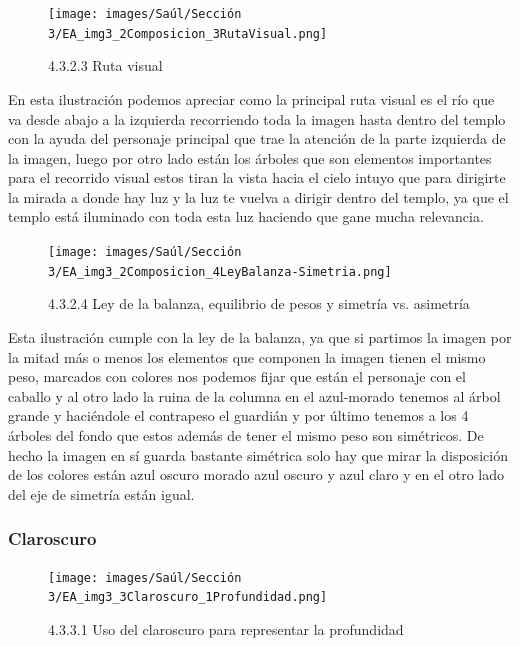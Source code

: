 \documentclass[12pt]{article}
\begin{document}
    \begin{figure}[H]
      \centering
      \texttt{[image: images/Saúl/Sección 3/EA\_img3\_2Composicion\_3RutaVisual.png]}
      \caption{\small 4.3.2.3 Ruta visual}
    \end{figure}

 En esta ilustración podemos apreciar como la principal ruta visual es el río que va desde abajo a la izquierda recorriendo toda la imagen hasta dentro del templo con la ayuda del personaje principal que trae la atención de la parte izquierda de la imagen, luego por otro lado están los árboles que son elementos importantes para el recorrido visual estos tiran la vista hacia el cielo intuyo que para dirigirte la mirada a donde hay luz y la luz te vuelva a dirigir dentro del templo, ya que el templo está iluminado con toda esta luz haciendo que gane mucha relevancia.

    \begin{figure}[H]
      \centering
      \texttt{[image: images/Saúl/Sección 3/EA\_img3\_2Composicion\_4LeyBalanza-Simetria.png]}
      \caption{\small 4.3.2.4 Ley de la balanza, equilibrio de pesos y simetría vs. asimetría}
    \end{figure}

Esta ilustración cumple con la ley de la balanza, ya que si partimos la imagen por la mitad más o menos los elementos que componen la imagen tienen el mismo peso, marcados con colores nos podemos fijar que están el personaje con el caballo y al otro lado la ruina de la columna en el azul-morado tenemos al árbol grande y haciéndole el contrapeso el guardián y por último tenemos a los 4 árboles del fondo que estos además de tener el mismo peso son simétricos. De hecho la imagen en sí guarda bastante simétrica solo hay que mirar la disposición de los colores están azul oscuro morado azul oscuro y azul claro y en el otro lado del eje de simetría están igual.



        \subsubsection{Claroscuro}

        
    \begin{figure}[H]
      \centering
      \texttt{[image: images/Saúl/Sección 3/EA\_img3\_3Claroscuro\_1Profundidad.png]}
      \caption{\small 4.3.3.1 Uso del claroscuro para representar la profundidad}
    \end{figure}
\end{document}
